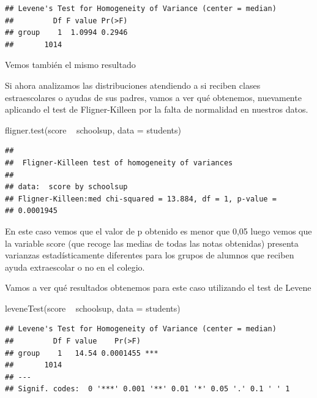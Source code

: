 \documentclass[]{article}
\newenvironment{Shaded}{\begin{snugshade}}{\end{snugshade}}
\newcommand{\DataTypeTok}[1]{\textcolor[rgb]{0.87,0.87,0.75}{#1}}
\newcommand{\KeywordTok}[1]{\textcolor[rgb]{0.94,0.87,0.69}{#1}}
\newcommand{\NormalTok}[1]{\textcolor[rgb]{0.80,0.80,0.80}{#1}}
\newcommand{\OperatorTok}[1]{\textcolor[rgb]{0.94,0.94,0.82}{#1}}
\newcommand{\StringTok}[1]{\textcolor[rgb]{0.80,0.58,0.58}{#1}}
\begin{document}
\begin{verbatim}
## Levene's Test for Homogeneity of Variance (center = median)
##         Df F value Pr(>F)
## group    1  1.0994 0.2946
##       1014
\end{verbatim}

Vemos también el mismo resultado

Si ahora analizamos las distribuciones atendiendo a si reciben clases
estraescolares o ayudas de sus padres, vamos a ver qué obtenemos,
nuevamente aplicando el test de Fligner-Killeen por la falta de
normalidad en nuestros datos.

\begin{Shaded}
\begin{Highlighting}[]
\KeywordTok{fligner.test}\NormalTok{(score }\OperatorTok{~}\StringTok{ }\NormalTok{schoolsup, }\DataTypeTok{data =}\NormalTok{ students)}
\end{Highlighting}
\end{Shaded}

\begin{verbatim}
## 
##  Fligner-Killeen test of homogeneity of variances
## 
## data:  score by schoolsup
## Fligner-Killeen:med chi-squared = 13.884, df = 1, p-value =
## 0.0001945
\end{verbatim}

En este caso vemos que el valor de p obtenido es menor que 0,05 luego
vemos que la variable score (que recoge las medias de todas las notas
obtenidas) presenta varianzas estadísticamente diferentes para los
grupos de alumnos que reciben ayuda extraescolar o no en el colegio.

Vamos a ver qué resultados obtenemos para este caso utilizando el test
de Levene

\begin{Shaded}
\begin{Highlighting}[]
\KeywordTok{leveneTest}\NormalTok{(score }\OperatorTok{~}\StringTok{ }\NormalTok{schoolsup, }\DataTypeTok{data =}\NormalTok{ students)}
\end{Highlighting}
\end{Shaded}

\begin{verbatim}
## Levene's Test for Homogeneity of Variance (center = median)
##         Df F value    Pr(>F)    
## group    1   14.54 0.0001455 ***
##       1014                      
## ---
## Signif. codes:  0 '***' 0.001 '**' 0.01 '*' 0.05 '.' 0.1 ' ' 1
\end{verbatim}
\end{document}
